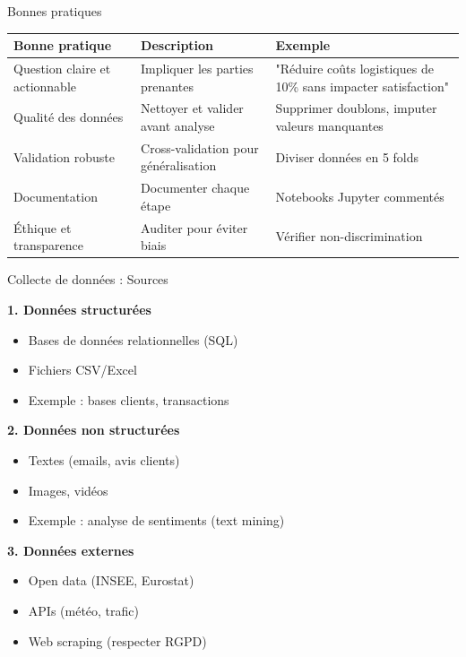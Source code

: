 \begin{frame}{Bonnes pratiques}

\small
\begin{tabular}{|p{3.5cm}|p{3cm}|p{3cm}|}
\hline
\textbf{Bonne pratique} & \textbf{Description} & \textbf{Exemple} \\
\hline
Question claire et actionnable & Impliquer les parties prenantes & "Réduire coûts logistiques de 10\% sans impacter satisfaction" \\
\hline
Qualité des données & Nettoyer et valider avant analyse & Supprimer doublons, imputer valeurs manquantes \\
\hline
Validation robuste & Cross-validation pour généralisation & Diviser données en 5 folds \\
\hline
Documentation & Documenter chaque étape & Notebooks Jupyter commentés \\
\hline
Éthique et transparence & Auditer pour éviter biais & Vérifier non-discrimination \\
\hline
\end{tabular}

\end{frame}

\begin{frame}{Collecte de données : Sources}

\textbf{1. Données structurées}
\begin{itemize}
    \item Bases de données relationnelles (SQL)
    \item Fichiers CSV/Excel
    \item Exemple : bases clients, transactions
\end{itemize}

\vspace{0.3cm}

\textbf{2. Données non structurées}
\begin{itemize}
    \item Textes (emails, avis clients)
    \item Images, vidéos
    \item Exemple : analyse de sentiments (text mining)
\end{itemize}

\vspace{0.3cm}

\textbf{3. Données externes}
\begin{itemize}
    \item Open data (INSEE, Eurostat)
    \item APIs (météo, trafic)
    \item Web scraping (respecter RGPD)
\end{itemize}

\end{frame}

